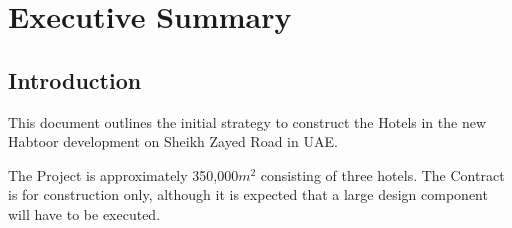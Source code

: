 

\makeatletter
\newenvironment{update}{\quotation}{\endquotation}
\makeatother
\chapter*{Executive Summary}





\section{Introduction}

This document outlines the initial strategy to construct the Hotels in the new Habtoor development on Sheikh Zayed Road in UAE.

The Project is approximately 350,000$m^2$ consisting of three hotels. The Contract is for construction only, although it is expected that a large design component will have to be executed.
